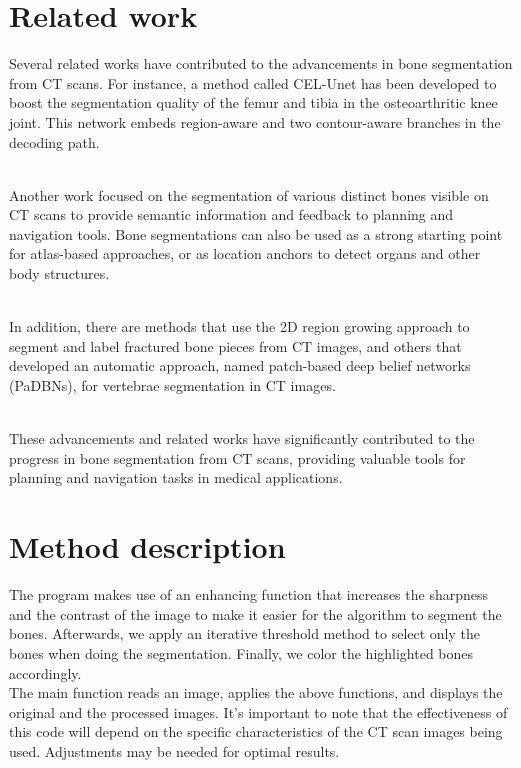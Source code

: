 \documentclass[conference]{IEEEtran}
\begin{document}
\section{Related work}
Several related works have contributed to the advancements in bone segmentation from CT scans. For instance, a method called CEL-Unet has been developed to boost the segmentation quality of the femur and tibia in the osteoarthritic knee joint. This network embeds region-aware and two contour-aware branches in the decoding path.

\\Another work focused on the segmentation of various distinct bones visible on CT scans to provide semantic information and feedback to planning and navigation tools. Bone segmentations can also be used as a strong starting point for atlas-based approaches, or as location anchors to detect organs and other body structures.

\\In addition, there are methods that use the 2D region growing approach to segment and label fractured bone pieces from CT images, and others that developed an automatic approach, named patch-based deep belief networks (PaDBNs), for vertebrae segmentation in CT images.

\\These advancements and related works have significantly contributed to the progress in bone segmentation from CT scans, providing valuable tools for planning and navigation tasks in medical applications.

\section{Method description}
The program makes use of an enhancing function that increases the sharpness and the contrast of the image to make it easier for the algorithm to segment the bones. Afterwards, we apply an iterative threshold method to select only the bones when doing the segmentation. Finally, we color the highlighted bones accordingly.
\\The main function reads an image, applies the above functions, and displays the original and the processed images. It’s important to note that the effectiveness of this code will depend on the specific characteristics of the CT scan images being used. Adjustments may be needed for optimal results.
\end{document}
